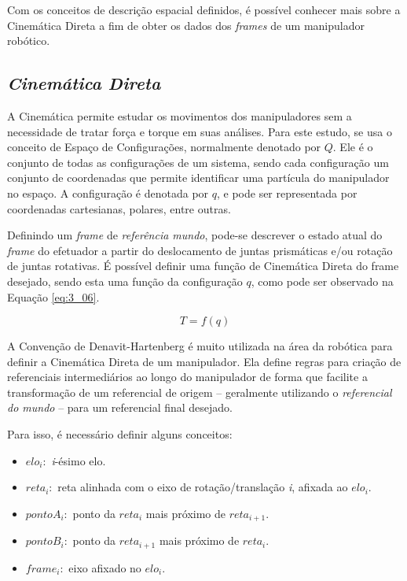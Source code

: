 Com os conceitos de descrição espacial definidos, é possível conhecer mais sobre a Cinemática Direta a fim de obter os dados dos \textit{frames} de um manipulador robótico.

\subsection{\textit{Cinemática Direta}}\label{sec:Cap3_CinDir}

A Cinemática permite estudar os movimentos dos manipuladores sem a necessidade de tratar força e torque em suas análises. Para este estudo, se usa o conceito de Espaço de Configurações, normalmente denotado por $Q$. Ele é o conjunto de todas as configurações de um sistema, sendo cada configuração um conjunto de coordenadas que permite identificar uma partícula do manipulador no espaço. A configuração é denotada por $q$, e pode ser representada por coordenadas cartesianas, polares, entre outras.

Definindo um \textit{frame} de \textit{referência mundo}, pode-se descrever o estado atual do \textit{frame} do efetuador a partir do deslocamento de juntas prismáticas e/ou rotação de juntas rotativas. É possível definir uma função de Cinemática Direta do frame desejado, sendo esta uma função da configuração $q$, como pode ser observado na Equação \ref{eq:3_06}.

\begin{equation}
T = f(q)
\label{eq:3_06}
\end{equation}

A Convenção de Denavit-Hartenberg é muito utilizada na área da robótica para definir a Cinemática Direta de um manipulador. Ela define regras para criação de referenciais intermediários ao longo do manipulador de forma que facilite a transformação de um referencial de origem – geralmente utilizando o \textit{referencial do mundo} – para um referencial final desejado.

Para isso, é necessário definir alguns conceitos:

\begin{itemize}
\item $elo_i:$ \textit{i}-ésimo elo.
\item $reta_i:$ reta alinhada com o eixo de rotação/translação \textit{i}, afixada ao $elo_i$. 
\item $pontoA_i:$ ponto da $reta_i$ mais próximo de $reta_{i+1}$.
\item $pontoB_i:$ ponto da $reta_{i+1}$ mais próximo de $reta_i$.
\item $frame_i:$ eixo afixado no $elo_i$.
\end{itemize}

